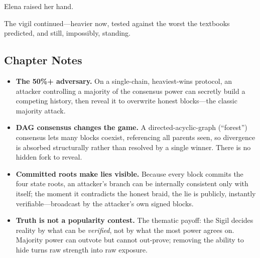 Elena raised her hand.

The vigil continued---heavier now, tested against the worst the textbooks
predicted, and still, impossibly, standing.

\hypertarget{chapter-22-notes}{%
\subsection{Chapter Notes}\label{chapter-22-notes}}

\begin{itemize}
\tightlist
\item
  \textbf{The 50\%+ adversary.} On a single-chain, heaviest-wins protocol, an
  attacker controlling a majority of the consensus power can secretly build a
  competing history, then reveal it to overwrite honest blocks---the classic
  majority attack.
\item
  \textbf{DAG consensus changes the game.} A directed-acyclic-graph (``forest'')
  consensus lets many blocks coexist, referencing all parents seen, so divergence
  is absorbed structurally rather than resolved by a single winner. There is no
  hidden fork to reveal.
\item
  \textbf{Committed roots make lies visible.} Because every block commits the four
  state roots, an attacker's branch can be internally consistent only with itself;
  the moment it contradicts the honest braid, the lie is publicly,
  instantly verifiable---broadcast by the attacker's own signed blocks.
\item
  \textbf{Truth is not a popularity contest.} The thematic payoff: the Sigil
  decides reality by what can be \emph{verified}, not by what the most power
  agrees on. Majority power can outvote but cannot out-prove; removing the ability
  to hide turns raw strength into raw exposure.
\end{itemize}
